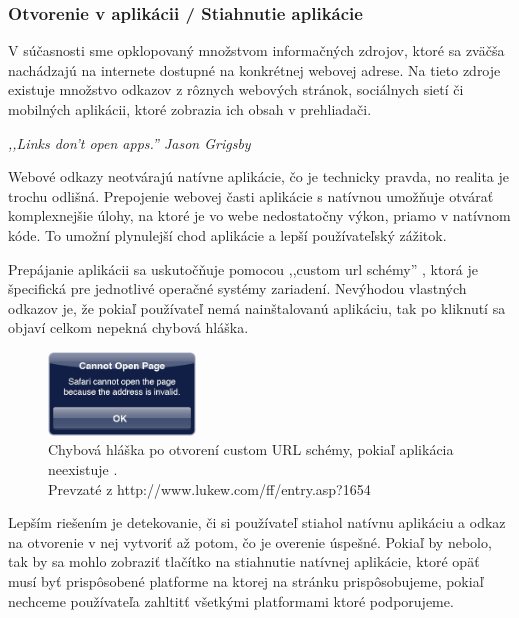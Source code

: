 
\subsubsection{Otvorenie v aplikácii / Stiahnutie aplikácie} %
\label{ssub:otvorenie_v_aplik_cii}

V súčasnosti sme opklopovaný množstvom informačných zdrojov, ktoré sa zväčša nachádzajú na internete dostupné na konkrétnej webovej adrese. Na tieto zdroje existuje množstvo odkazov z rôznych webových stránok, sociálnych sietí či mobilných aplikácii, ktoré zobrazia ich obsah v prehliadači.

\begin{fancybox}
\textit{,,Links don’t open apps.'' Jason Grigsby} \cite{links}
\end{fancybox}

Webové odkazy neotvárajú natívne aplikácie, čo je technicky pravda, no realita je trochu odlišná. Prepojenie webovej časti aplikácie s natívnou umožňuje otvárať komplexnejšie úlohy, na ktoré je vo webe nedostatočny výkon, priamo v natívnom kóde. To umožní plynulejší chod aplikácie a lepší používateľský zážitok.

Prepájanie aplikácii sa uskutočňuje pomocou ,,custom url schémy'' \cite{urlscheme}, ktorá je špecifická pre jednotlivé operačné systémy zariadení. Nevýhodou vlastných odkazov je, že pokiaľ používateľ nemá nainštalovanú aplikáciu, tak po kliknutí sa objaví celkom nepekná chybová hláška.

\begin{figure}[H]
	\centering
	\includegraphics[width=0.35\textwidth]{img/customerror.png}
	\caption[Chybová hláška po otvorení custom URL schémy, pokiaľ aplikácia neexistuje]{
		Chybová hláška po otvorení custom URL schémy, pokiaľ aplikácia neexistuje \cite{customscheme}.\\
		Prevzaté z http://www.lukew.com/ff/entry.asp?1654}
	\label{fig: customerror}
\end{figure}

Lepším riešením je detekovanie, či si používateľ stiahol natívnu aplikáciu a odkaz na otvorenie v nej vytvoriť až potom, čo je overenie úspešné. Pokiaľ by nebolo, tak by sa mohlo zobraziť tlačítko na stiahnutie natívnej aplikácie, ktoré opäť musí byť prispôsobené platforme na ktorej na stránku prispôsobujeme, pokiaľ nechceme používateľa zahltitť všetkými platformami ktoré podporujeme.

